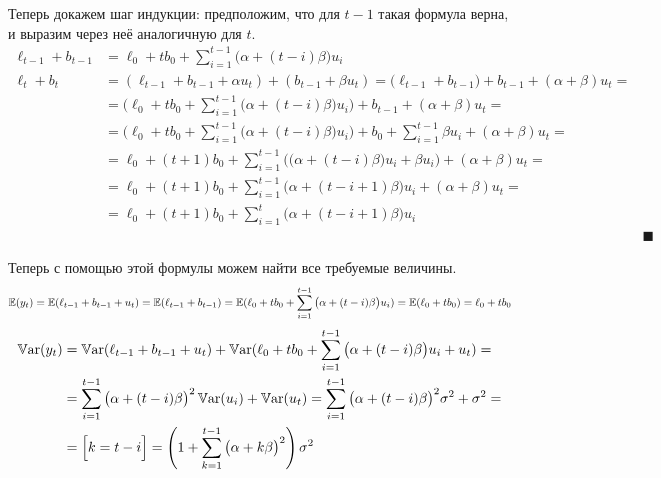 \begin{problem}
\begin{sol}
  Теперь докажем шаг индукции: предположим, что для $t - 1$ такая формула верна, и выразим через неё аналогичную для $t$.
  \begin{align*}
  \ell_{t-1} + b_{t-1} &= \ell_0 + t b_0 + \sum_{i = 1}^{t-1} \big(\alpha + (t - i)\beta\big) u_i \\
      \ell_t + b_t &= (\ell_{t-1} + b_{t-1} + \alpha u_t) + (b_{t-1} + \beta u_t) = \big(\ell_{t-1} + b_{t-1}\big) + b_{t-1} + (\alpha + \beta) u_t = \\
      &= \Big( \ell_0 + t b_0 + \sum_{i = 1}^{t-1} \big(\alpha + (t - i)\beta\big) u_i \Big) + b_{t-1} + (\alpha + \beta) u_t = \\
      &= \Big( \ell_0 + t b_0 + \sum_{i = 1}^{t-1} \big(\alpha + (t - i)\beta\big) u_i \Big) + b_0 + \sum_{i = 1}^{t-1} \beta u_i + (\alpha + \beta) u_t = \\
      &= \ell_0 + (t + 1) b_0 + \sum_{i = 1}^{t-1} \Big(\big(\alpha + (t - i)\beta\big) u_i + \beta u_i \Big) + (\alpha + \beta) u_t = \\
      &= \ell_0 + (t + 1) b_0 + \sum_{i = 1}^{t-1} \big(\alpha + (t - i + 1)\beta\big) u_i + (\alpha + \beta) u_t = \\
      &= \ell_0 + (t + 1) b_0 + \sum_{i = 1}^{t} \big(\alpha + (t - i + 1)\beta\big) u_i \\
      &&\blacksquare
  \end{align*}
  
  Теперь с помощью этой формулы можем найти все требуемые величины.
  \[
      \operatorname{\mathbb{E}}(y_t) = \operatorname{\mathbb{E}}(\ell_{t-1} + b_{t-1} + u_t) = \operatorname{\mathbb{E}}(\ell_{t-1} + b_{t-1}) = \operatorname{\mathbb{E}}(\ell_0 + t b_0 + \sum_{i = 1}^{t-1} \big(\alpha + (t - i)\beta\big) u_i) = \operatorname{\mathbb{E}}(\ell_0 + t b_0) = \ell_0 + tb_0 \\
  \]
  \begin{align*}
      \operatorname{\mathbb{V}\mathrm{ar}}(y_t) &= \operatorname{\mathbb{V}\mathrm{ar}}(\ell_{t-1} + b_{t-1} + u_t) + \operatorname{\mathbb{V}\mathrm{ar}}(\ell_0 + t b_0 + \sum_{i = 1}^{t-1} \big(\alpha + (t - i)\beta\big) u_i + u_t) = \\
      &= \sum_{i = 1}^{t-1}\big(\alpha + (t - i)\beta\big)^2 \operatorname{\mathbb{V}\mathrm{ar}}(u_i) + \operatorname{\mathbb{V}\mathrm{ar}}(u_t) = \sum_{i = 1}^{t-1}\big(\alpha + (t - i)\beta\big)^2 \sigma^2 + \sigma^2 = \\
      &= \Big[k = t - i\Big]= \left( 1 + \sum_{k = 1}^{t-1}\big(\alpha + k\beta\big)^2 \right)\sigma^2 \\
  \end{align*}
  

\end{sol}
\end{problem}
